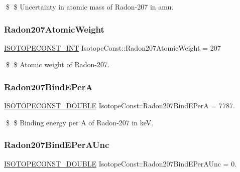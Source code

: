 \$ \$ Uncertainty in atomic mass of Radon-\/207 in amu. \mbox{\label{group___isotope_const-_radon-_rn207_ga0b34e39b950c96cf1724b01a740c82ea}} 
\subsubsection{\texorpdfstring{Radon207\+Atomic\+Weight}{Radon207AtomicWeight}}
{\footnotesize\ttfamily \mbox{\hyperlink{group___isotope_const-_macros_ga5f18360b3e99483a35c32d789e62621c}{I\+S\+O\+T\+O\+P\+E\+C\+O\+N\+S\+T\+\_\+\+I\+NT}} Isotope\+Const\+::\+Radon207\+Atomic\+Weight = 207}

\$ \$ Atomic weight of Radon-\/207. \mbox{\label{group___isotope_const-_radon-_rn207_gadf738b5f9d6329cdcdf0b22b6102ff37}} 
\subsubsection{\texorpdfstring{Radon207\+Bind\+E\+PerA}{Radon207BindEPerA}}
{\footnotesize\ttfamily \mbox{\hyperlink{group___isotope_const-_macros_ga8f45a7272ce02c0b4c65c44636ed719a}{I\+S\+O\+T\+O\+P\+E\+C\+O\+N\+S\+T\+\_\+\+D\+O\+U\+B\+LE}} Isotope\+Const\+::\+Radon207\+Bind\+E\+PerA = 7787.}

\$ \$ Binding energy per A of Radon-\/207 in keV. \mbox{\label{group___isotope_const-_radon-_rn207_gaaab834800294bd7fda4319db15e74d7f}} 
\subsubsection{\texorpdfstring{Radon207\+Bind\+E\+Per\+A\+Unc}{Radon207BindEPerAUnc}}
{\footnotesize\ttfamily \mbox{\hyperlink{group___isotope_const-_macros_ga8f45a7272ce02c0b4c65c44636ed719a}{I\+S\+O\+T\+O\+P\+E\+C\+O\+N\+S\+T\+\_\+\+D\+O\+U\+B\+LE}} Isotope\+Const\+::\+Radon207\+Bind\+E\+Per\+A\+Unc = 0.}

